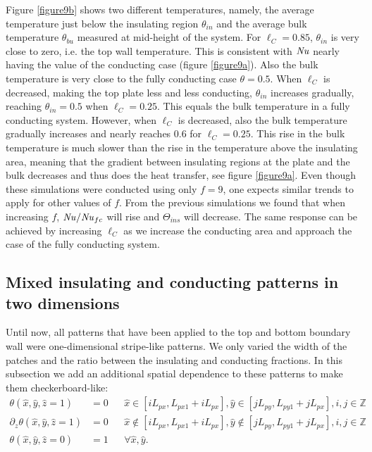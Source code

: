 \documentclass{jfm}
\newcommand\Nus{\mbox{\textit{Nu}}}  %
\begin{document}
Figure \ref{figure9b} shows two different temperatures, namely, the average
temperature just below the insulating region $\theta_{in}$ and the average
bulk temperature $\theta_{bu}$ measured at mid-height of the system.  For
$\ell_C=0.85$, $\theta_{in}$ is very close to zero, i.e. the top wall
temperature.  This is consistent with $\Nus$ nearly having the value of the
conducting case (figure \ref{figure9a}).  Also the bulk temperature is very
close to the fully conducting case $\theta=0.5$.  When $\ell_C$ is decreased,
making the top plate less and less conducting, $\theta_{in}$ increases
gradually, reaching $\theta_{in}=0.5$ when $\ell_C=0.25$.  This equals the
bulk temperature in a fully conducting system.  However, when $\ell_C$ is
decreased, also the bulk temperature gradually increases and nearly reaches
0.6 for $\ell_C=0.25$.  This rise in the bulk temperature is much slower than
the rise in the temperature above the insulating area, meaning that the
gradient between insulating regions at the plate and the bulk decreases and
thus does the heat transfer, see figure \ref{figure9a}.  Even though these
simulations were conducted using only $f=9$, one expects similar trends to
apply for other values of $f$.  From the previous simulations we found that
when increasing $f$, $\Nus/\Nus_{fc}$ will rise and $\Theta_{ins}$ will
decrease.  The same response can be achieved by increasing $\ell_C$ as we
increase the conducting area and approach the case of the fully conducting
system.

%
\subsection{Mixed insulating and conducting patterns in two
dimensions}\label{mixedTwoDimensions} Until now, all patterns that have been
applied to the top and bottom boundary wall were one-dimensional stripe-like
patterns.  We only varied the width of the patches and the ratio between the
insulating and conducting fractions.  In this subsection we add an additional
spatial dependence to these patterns to make them checkerboard-like:
%
\begin{equation}
\begin{aligned}
\theta(\hat{x},\hat{y},\hat{z}=1) &= 0 &&
\hat{x} \in \left[ i L_{px},L_{px1}+i L_{px} \right], \hat{y} \in \left[ j
L_{py},L_{py1}+j L_{px} \right], i,j \in \mathbb{Z} \\ \partial_z
\theta(\hat{x},\hat{y},\hat{z}=1) &= 0 && \hat{x} \notin \left[ i
L_{px},L_{px1}+i L_{px} \right], \hat{y} \notin \left[ j L_{py},L_{py1}+j
L_{px} \right], i,j \in \mathbb{Z} \\ \theta(\hat{x},\hat{y},\hat{z}=0) &= 1
                                                                        &&
\forall \hat{x},\hat{y}.  \end{aligned} \label{eq:boundaryConditions2d}
\end{equation}
\end{document}

